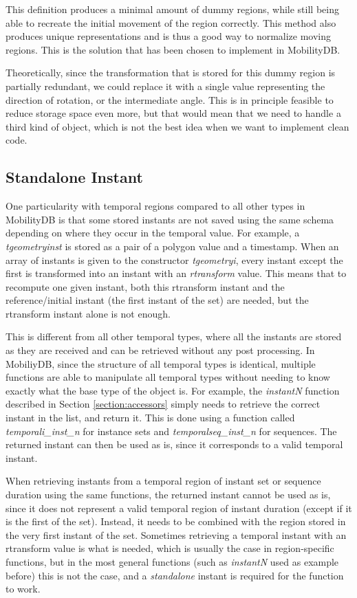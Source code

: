 This definition produces a minimal amount of dummy regions, while still being able to recreate the initial movement of the region correctly. This method also produces unique representations and is thus a good way to normalize moving regions. This is the solution that has been chosen to implement in MobilityDB.

Theoretically, since the transformation that is stored for this dummy region is partially redundant, we could replace it with a single value representing the direction of rotation, or the intermediate angle. This is in principle feasible to reduce storage space even more, but that would mean that we need to handle a third kind of object, which is not the best idea when we want to implement clean code. 

\subsection{Standalone Instant}
\label{section:standalone_inst}

One particularity with temporal regions compared to all other types in MobilityDB is that some stored instants are not saved using the same  schema depending on where they occur in the temporal value. For example, a \textit{tgeometryinst} is stored as a pair of a polygon value and a timestamp. When an array of instants is given to the constructor \textit{tgeometryi}, every instant except the first is transformed into an instant with an \textit{rtransform} value. This means that to recompute one given instant, both this rtransform instant and the reference/initial instant (the first instant of the set) are needed, but the rtransform instant alone is not enough. 

This is different from all other temporal types, where all the instants are stored as they are received and can be retrieved without any post processing. In MobiliyDB, since the structure of all temporal types is identical, multiple functions are able to manipulate all temporal types without needing to know exactly what the base type of the object is. For example, the \textit{instantN} function described in Section \ref{section:accessors} simply needs to retrieve the correct instant in the list, and return it. This is done using a function called \textit{temporali\_inst\_n} for instance sets and \textit{temporalseq\_inst\_n} for sequences. The returned instant can then be used as is, since it corresponds to a valid temporal instant.

When retrieving instants from a temporal region of instant set or sequence duration using the same functions, the returned instant cannot be used as is, since it does not represent a valid temporal region of instant duration (except if it is the first of the set). Instead, it needs to be combined with the region stored in the very first instant of the set. Sometimes retrieving a temporal instant with an rtransform value is what is needed, which is usually the case in region-specific functions, but in the most general functions (such as \textit{instantN} used as example before) this is not the case, and a \textit{standalone} instant is required for the function to work.

